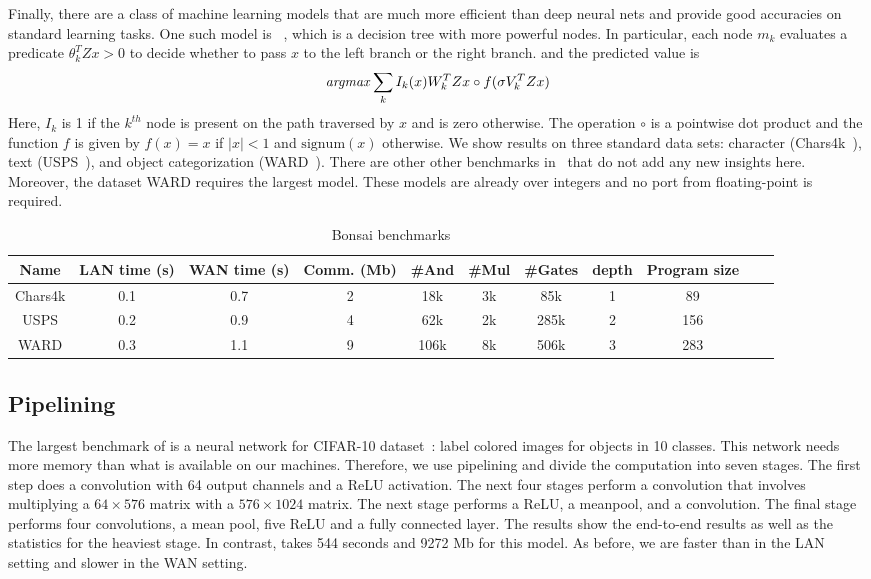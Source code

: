 Finally, there are a class of machine learning models that are much more efficient than
deep neural nets and provide good accuracies on standard learning tasks. One such model
is \bonsai~\cite{bonsai}, which is a decision tree with more powerful nodes.
In particular, each node $m_k$ evaluates a predicate $\theta_k^TZx > 0$ to decide whether
to pass $x$ to the left branch or the right branch. and the predicted value is
\[
{\it argmax} \sum_k I_k(x)W_k^TZx\circ f(\sigma V_k^TZx) 
\]
Here, $I_k$ is 1 if the $k^{th}$ node is present on the path traversed by $x$
and is zero otherwise. 
The operation $\circ$ is a pointwise dot product and
the function $f$ is given by $f(x) = x$ if $|x| < 1$ and $\mathrm{signum}(x)$ otherwise.
We show results on three standard data sets: character  (Chars4k~\cite{campos}), text (USPS~\cite{hull}), and object categorization (WARD~\cite{yang}). There are other other benchmarks in~\cite{bonsai} that do not add any new insights here. Moreover, the dataset WARD requires the largest model. These models are already over integers and no port from floating-point is required.


\begin{table*}
\begin{tabular}{c|c|c|c |c|c|c|c|c|c | c}
Name       & LAN time (s) & WAN time (s) & Comm. (Mb)  & \#And & \#Mul & \#Gates & depth & Program size\\
\hline
Chars4k    &  0.1         & 0.7         & 2            & 18k    & 3k    &  85k     & 1   & 89\\
\hline
USPS       &  0.2         & 0.9         & 4            & 62k    & 2k    &  285k    & 2   & 156\\
\hline
WARD       &  0.3         & 1.1         & 9            & 106k    & 8k    &  506k    & 3   & 283\\
\hline
\end{tabular}

 \caption{Bonsai benchmarks}
 \label{tab:bonsai} 
\end{table*}

\subsection{Pipelining}
The largest benchmark of \minion is a neural network for CIFAR-10 dataset~\cite{cifar}: label colored images for objects in 10 classes. This network needs more memory than what is available
on our machines. Therefore, we use pipelining and divide the computation into seven stages.
The first step does a convolution with 64 output channels and a ReLU activation.
The next four stages perform a convolution that involves multiplying a $64\times 576$ matrix with a
$576\times 1024$ matrix. The next stage performs a ReLU, a meanpool, and a convolution.
The final stage performs four convolutions, a mean pool, five ReLU and a fully connected layer.
The results show the end-to-end results as well as the statistics for the heaviest stage.
In contrast, \minion takes 544 seconds and 9272 Mb for this model. As before, we are faster than
\minion in the LAN setting and slower in the WAN setting.

